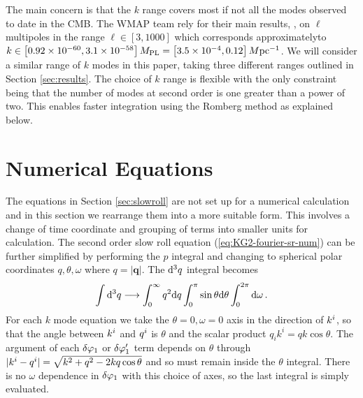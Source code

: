 The main concern is that the $k$ range covers most if not all the modes observed
to date in the CMB. The WMAP team rely for their main results,
\cite{Komatsu:2008hk},  
 on $\ell$ multipoles in the range $\ell \in [3, 1000]$
which corresponds approximately\footnotemark  to $k\in \left[0.92 \times 10^{-60}, 3.1 \times
10^{-58}\right]M_{\mathrm{PL}} = \left[3.5\times 10^{-4}, 0.12\right] M \mathrm{pc}^{-1}$.
We will consider a similar range of $k$ modes in this paper, taking three
different ranges outlined in Section \ref{sec:results}. The
choice of $k$ range is flexible with the only constraint being that the number
of modes at second order is one greater than a power of two. This enables faster
integration using the Romberg method as explained below. 



\section{Numerical Equations}
\label{sec:eqs-num}


The equations in Section \ref{sec:slowroll} are not set up for a
numerical calculation and in this section we rearrange them into a more
suitable form. This involves a change of time coordinate and grouping of terms
into smaller units for calculation.
The second order slow roll equation (\ref{eq:KG2-fourier-sr-num}) can be further
simplified by performing the $p$
integral and changing to spherical polar coordinates $q, \theta, \omega$ where
$q=|\textbf{q}|$. The $\mathrm{d}^3q$ integral becomes
% 
\begin{equation}
 \int \mathrm{d}^3q \longrightarrow \int_{0}^{\infty} q^2 \mathrm{d} q \int_{0}^{\pi}\sin \theta
\mathrm{d}\theta 
   \int_{0}^{2\pi}\mathrm{d}\omega \,.
\end{equation}
% 
For each $k$ mode equation we take the $\theta=0, \omega=0$ axis in the
direction of $k^i$, so that the angle between $k^i$ and $q^i$ is
$\theta$ and the scalar product $q_i k^i = q k \cos\theta$. 
The argument of
each $\delta\varphi_{1}$ or $\delta\varphi_{1}'$ term depends on $\theta$ through
$|k^i-q^i|=\sqrt{k^2 + q^2 -2kq \cos\theta}$ and
so must remain inside the $\theta$ integral. There is no $\omega$ dependence
in $\delta\varphi_{1}$ with this choice of axes, so the last integral is simply evaluated.


